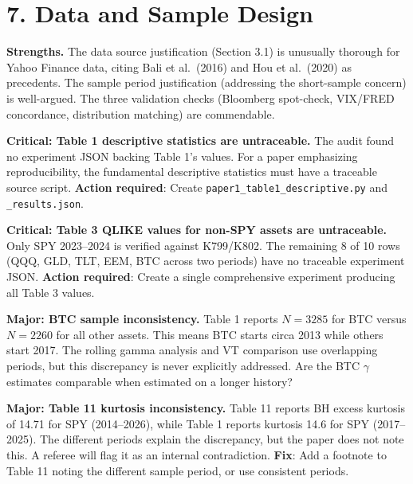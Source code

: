 \documentclass[12pt,a4paper]{article}
\begin{document}
\bigskip

\section*{7. Data and Sample Design}

\textcolor{okgreen}{\textbf{Strengths.}} The data source justification (Section 3.1) is unusually thorough for Yahoo Finance data, citing Bali et al.\ (2016) and Hou et al.\ (2020) as precedents. The sample period justification (addressing the short-sample concern) is well-argued. The three validation checks (Bloomberg spot-check, VIX/FRED concordance, distribution matching) are commendable.

\textcolor{errorred}{\textbf{Critical: Table 1 descriptive statistics are untraceable.}} The audit found no experiment JSON backing Table 1's values. For a paper emphasizing reproducibility, the fundamental descriptive statistics must have a traceable source script. \textbf{Action required}: Create \texttt{paper1\_table1\_descriptive.py} and \texttt{\_results.json}.

\textcolor{errorred}{\textbf{Critical: Table 3 QLIKE values for non-SPY assets are untraceable.}} Only SPY 2023--2024 is verified against K799/K802. The remaining 8 of 10 rows (QQQ, GLD, TLT, EEM, BTC across two periods) have no traceable experiment JSON. \textbf{Action required}: Create a single comprehensive experiment producing all Table 3 values.

\textcolor{warncolor}{\textbf{Major: BTC sample inconsistency.}} Table 1 reports $N = 3285$ for BTC versus $N = 2260$ for all other assets. This means BTC starts circa 2013 while others start 2017. The rolling gamma analysis and VT comparison use overlapping periods, but this discrepancy is never explicitly addressed. Are the BTC $\gamma$ estimates comparable when estimated on a longer history?

\textcolor{warncolor}{\textbf{Major: Table 11 kurtosis inconsistency.}} Table 11 reports BH excess kurtosis of 14.71 for SPY (2014--2026), while Table 1 reports kurtosis 14.6 for SPY (2017--2025). The different periods explain the discrepancy, but the paper does not note this. A referee will flag it as an internal contradiction. \textbf{Fix}: Add a footnote to Table 11 noting the different sample period, or use consistent periods.

\bigskip

\end{document}
